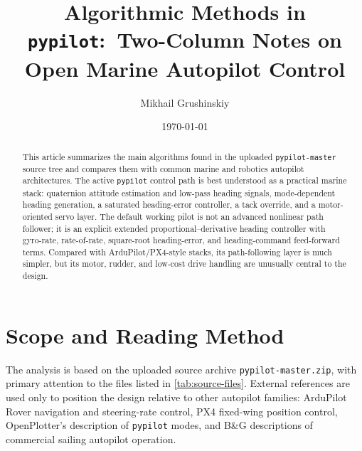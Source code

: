 \documentclass[11pt,twocolumn]{article}
\title{Algorithmic Methods in \texttt{pypilot}:\ Two-Column Notes on Open Marine Autopilot Control}
\author{Mikhail Grushinskiy}
\date{\today}
\begin{document}
\maketitle

\begin{abstract}
This article summarizes the main algorithms found in the uploaded
\texttt{pypilot-master} source tree and compares them with common marine and robotics
autopilot architectures.  The active \texttt{pypilot} control path is best understood
as a practical marine stack: quaternion attitude estimation and low-pass heading
signals, mode-dependent heading generation, a saturated heading-error controller,
a tack override, and a motor-oriented servo layer.  The default working pilot is not
an advanced nonlinear path follower; it is an explicit extended proportional--derivative
heading controller with gyro-rate, rate-of-rate, square-root heading-error, and
heading-command feed-forward terms.  Compared with ArduPilot/PX4-style stacks, its
path-following layer is much simpler, but its motor, rudder, and low-cost drive
handling are unusually central to the design.
\end{abstract}

\section{Scope and Reading Method}

The analysis is based on the uploaded source archive \texttt{pypilot-master.zip},
with primary attention to the files listed in \cref{tab:source-files}.  External
references are used only to position the design relative to other autopilot families:
ArduPilot Rover navigation and steering-rate control, PX4 fixed-wing position control,
OpenPlotter's description of \texttt{pypilot} modes, and B\&G descriptions of commercial
sailing autopilot operation.
\end{document}
